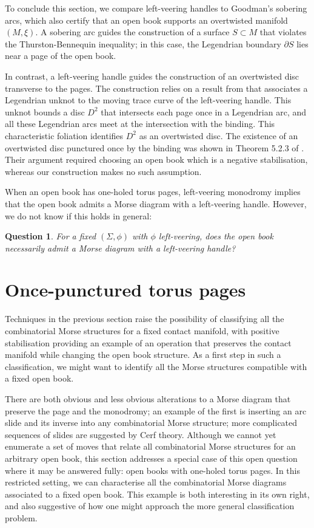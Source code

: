 \documentclass{amsart}
\newtheorem{question}[theorem]{Question}
\theoremstyle{definition}
\begin{document}
To conclude this section, we compare left-veering handles to Goodman's sobering arcs, which also certify that an open book supports an overtwisted manifold $(M, \xi)$.  A sobering arc guides the construction  of a surface $S\subset M$ that violates the Thurston-Bennequin inequality; in this case, the  Legendrian boundary $\partial S$ lies  near a page of the open book.  
 
 In contrast, a left-veering handle  guides the construction of an overtwisted disc transverse to the pages.  The construction relies on a result from \cite{GL} that associates a Legendrian unknot to the moving trace curve of the left-veering handle.  This unknot bounds a disc $D^2$ that intersects each page once in a Legendrian arc, and all these Legendrian arcs meet at the intersection with the binding.  This characteristic foliation identifies $D^2$ as an overtwisted disc.  The existence of an overtwisted disc punctured once by the binding was shown in Theorem 5.2.3 of \cite{BO}.  Their argument  required choosing an open book which is a negative stabilisation, whereas our construction makes no such assumption.    



 
 When an open book has one-holed torus pages,  left-veering monodromy implies that the open book admits a Morse diagram with a left-veering handle.  
  However, we do not know if this holds in general: 

\begin{question}
    For a fixed $(\Sigma, \phi)$ with $\phi$ left-veering, does the open book necessarily admit a Morse diagram with a left-veering handle? 
   \end{question}






\section{Once-punctured torus pages}\label{sec:monodromy}
Techniques in the previous section raise the possibility of classifying all the combinatorial Morse structures for a fixed contact manifold, with positive stabilisation providing an example of an operation that preserves the contact manifold while changing the open book structure.  As a first step in such a classification, we might want to identify all the Morse structures compatible with a fixed open book. 

There are both obvious and less obvious alterations to a Morse diagram that preserve the page and the monodromy; an example of the first is inserting an arc slide and its inverse into any combinatorial Morse structure;  more complicated sequences of slides are suggested by Cerf theory.  Although we cannot yet enumerate a set of  moves that relate all combinatorial Morse structures for an arbitrary open book, this  section addresses a special case of this open question where it may be answered fully: open books with one-holed torus pages.  In this restricted setting, we can characterise all the combinatorial Morse diagrams associated to a fixed open book.  This example is both interesting in its own right, and also suggestive of how one might approach the more general classification problem.
\end{document}

